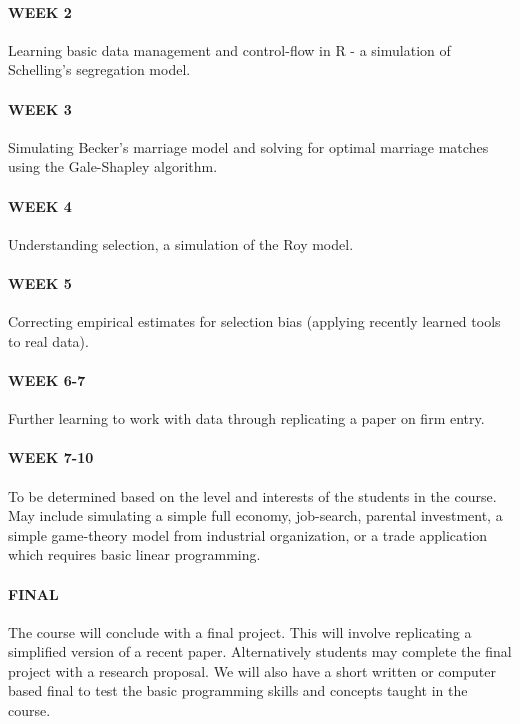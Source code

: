 \documentclass{scrartcl}
\begin{document}
\paragraph{WEEK 2}
Learning basic data management and control-flow in R - a simulation of Schelling's segregation model.


\paragraph{WEEK 3}
Simulating Becker's marriage model and solving for optimal marriage matches using the Gale-Shapley algorithm.

\paragraph{WEEK 4}
Understanding selection, a simulation of the Roy model.

\paragraph{WEEK 5}
Correcting empirical estimates for selection bias (applying recently learned tools to real data).

\paragraph{WEEK 6-7}
Further learning to work with data through replicating a paper on firm entry. 

\paragraph{WEEK 7-10}
To be determined based on the level and interests of the students in the course. May include simulating a simple full economy, job-search, parental investment, a simple game-theory model from industrial organization, or a trade application which requires basic linear programming. 

\paragraph{FINAL}
The course will conclude with a final project. This will involve replicating a simplified version of a recent paper. Alternatively students may complete the final project with a research proposal. We will also have a short written or computer based final to test the basic programming skills and concepts taught in the course. 
\end{document}
